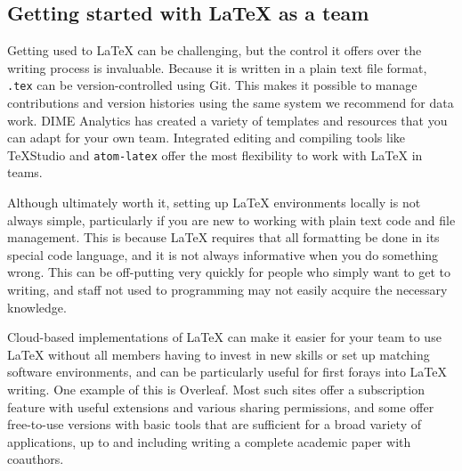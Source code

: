 \subsection{Getting started with {\LaTeX} as a team}

Getting used to {\LaTeX} can be challenging,
but the control it offers over the writing process is invaluable.
Because it is written in a plain text file format,
\texttt{.tex} can be version-controlled using Git.
This makes it possible to manage contributions and version histories
using the same system we recommend for data work.
DIME Analytics has created a variety of templates and resources
that you can adapt for your own team.
Integrated editing and compiling tools like TeXStudio
and \texttt{atom-latex}
offer the most flexibility to work with {\LaTeX} in teams.

Although ultimately worth it, setting up {\LaTeX} environments locally is not always simple,
particularly if you are new to working with plain text code and file management.
This is because {\LaTeX} requires that all formatting be done in its special code language,
and it is not always informative when you do something wrong.
This can be off-putting very quickly for people
who simply want to get to writing,
and staff not used to programming may not easily acquire the necessary knowledge.

Cloud-based implementations of {\LaTeX} can make it easier for your team to use
{\LaTeX} without all members having to invest in new skills
or set up matching software environments,
and can be particularly useful for first forays into {\LaTeX} writing.
One example of this is Overleaf.
Most such sites offer a subscription feature
with useful extensions and various sharing permissions,
and some offer free-to-use versions with basic tools that are sufficient
for a broad variety of applications,
up to and including writing a complete academic paper with coauthors.

